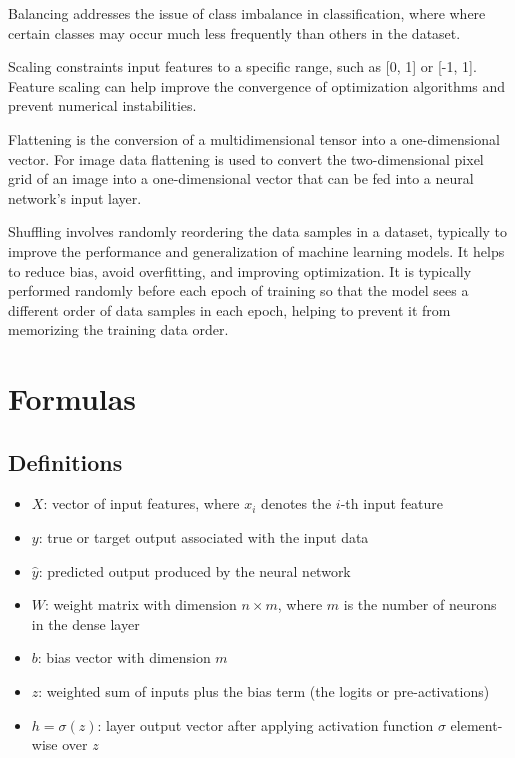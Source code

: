 \documentclass[a4paper]{report}
\begin{document}
\begin{description}
Balancing addresses the issue of class imbalance in classification, where where certain classes may occur much less frequently than others in the dataset. 

Scaling constraints input features to a specific range, such as [0, 1] or [-1, 1]. Feature scaling can help improve the convergence of optimization algorithms and prevent numerical instabilities.

Flattening is the conversion of a multidimensional tensor into a one-dimensional vector. For image data flattening is used to convert the two-dimensional pixel grid of an image into a one-dimensional vector that can be fed into a neural network's input layer.

Shuffling involves randomly reordering the data samples in a dataset, typically to improve the performance and generalization of machine learning models. It helps to reduce bias, avoid overfitting, and improving optimization. It is typically performed randomly before each epoch of training so that the model sees a different order of data samples in each epoch, helping to prevent it from memorizing the training data order.
\end{description}



\chapter{Formulas}


\section{Definitions}

\begin{itemize}
\item $X$: vector of input features, where $x_i$ denotes the $i$-th input feature
\item $y$: true or target output associated with the input data
\item $\hat{y}$: predicted output produced by the neural network
\item $W$: weight matrix with dimension $n \times m$, where $m$ is the number of neurons in the dense layer
\item $b$: bias vector with dimension $m$
\item $z$: weighted sum of inputs plus the bias term (the logits or pre-activations)
\item $h=\sigma(z)$: layer output vector after applying activation function $\sigma$ element-wise over $z$
\end{itemize}
\end{document}
